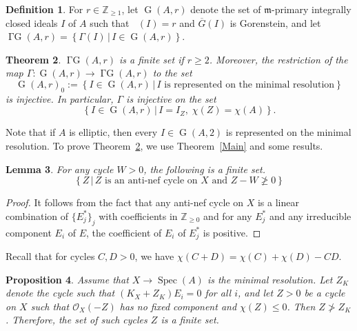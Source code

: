 \documentclass[12pt]{amsart}
\newtheorem{thm}{Theorem}[section]
\newtheorem{lem}[thm]{Lemma}
\newtheorem{prop}[thm]{Proposition}
\theoremstyle{definition}
\newtheorem{defn}[thm]{Definition}
\theoremstyle{remark}
\numberwithin{equation}{section}
\newcommand{\thmref}[1]{Theorem~\ref{#1}}
\DeclareMathOperator{\spec}{Spec}
\DeclareMathOperator{\G}{G}
\DeclareMathOperator{\GG}{\Gamma G}
\DeclareMathOperator{\br}{\bar r}
\newcommand{\m}{\mathfrak m}
\newcommand{\Z}{\mathbb Z}
\newcommand{\cO}{\mathcal O}
\renewcommand{\:}{\colon}
\newcommand{\defset}[2]{{\left\{#1\,\left| \,#2 \right. \right\}}}
\begin{document}
\begin{defn}
For $r \in \Z_{\ge 1}$, let $\G(A,r)$ denote the set of $\m$-primary integrally closed ideals $I$ of $A$ such that $\br(I)=r$ and $\overline{G}(I)$ is Gorenstein, and let $\GG(A,r)=\defset{\Gamma(I)}{I \in \G(A,r)}$.
\end{defn}

\begin{thm}\label{t:GG}
$\GG(A,r)$ is a finite set if $r \ge 2$.
Moreover, the restriction of the map $\Gamma\:  \G(A,r) \to \GG(A,r)$ to the set 
\[
\G(A,r)_0:=\defset{I \in \G(A,r)}{\text{$I$ is represented on the minimal resolution}}
\]
 is injective.
In particular, $\Gamma$ is injective on the set
\[
\defset{I \in \G(A,r)}{I = I_Z, \; \chi(Z)=\chi(A)}.
\]
\end{thm}

Note that if $A$ is elliptic, then every $I \in \G(A,2)$  is represented on the minimal resolution.
To prove \thmref{t:GG}, we use \thmref{Main} and some results.

\begin{lem}\label{l:minres}
 For any cycle  $W>0$,
 the following is a finite set.
\[
\defset{Z}{\text{$Z$ is an anti-nef cycle  on $X$ and 
$Z - W \not \ge 0$}}
\]
\end{lem}

\begin{proof}
It follows from the fact that any anti-nef cycle on $X$ is a linear combination of $\{E_j^*\}_j$
 with coefficients in $\Z_{\ge 0}$ and for any $E_j^*$ and any irreducible component 
 $E_i$ of $E$, the coefficient of $E_i$ of $E_j^*$ is positive. 
\end{proof}

\par \vspace{1mm}
Recall that for cycles $C,D>0$, we have 
$\chi(C+D)=\chi(C)+\chi(D)-CD$.

\begin{prop}\label{p:ZcA}
Assume that  $X \to \spec (A)$ is the minimal resolution.
Let $Z_K$ denote the cycle such that $(K_X+Z_K)E_i=0$ for all $i$, 
and let  $Z>0$ be a cycle on $X$ such that $\cO_X(-Z)$
has no fixed component and  $\chi(Z) \le 0$.
Then $Z\not > Z_K$. 
Therefore, the set of such cycles  $Z$  is a finite set.
\end{prop}
\end{document}
